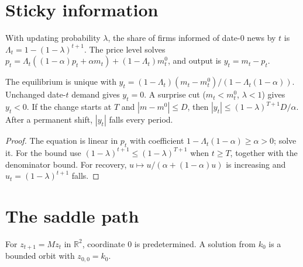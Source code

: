 \section{Sticky information}

\begin{definition}
\label{def:sticky}
\leanok
With updating probability $\lambda$, the share of firms informed of date-0 news by $t$ is
$\Lambda_t = 1-(1-\lambda)^{t+1}$. The price level solves
$p_t = \Lambda_t((1-\alpha)p_t + \alpha m_t) + (1-\Lambda_t)m^0_t$, and output is $y_t = m_t - p_t$.
\end{definition}

\begin{theorem}
\label{thm:sticky}
\leanok
{}
The equilibrium is unique with $y_t = (1-\Lambda_t)(m_t - m^0_t)/(1-\Lambda_t(1-\alpha))$. Unchanged date-$t$ demand
gives $y_t = 0$. A surprise cut ($m_t < m^0_t$, $\lambda<1$) gives $y_t < 0$. If the change starts at $T$ and
$|m - m^0| \le D$, then $|y_t| \le (1-\lambda)^{T+1}D/\alpha$. After a permanent shift, $|y_t|$ falls every period.
\end{theorem}
\begin{proof}
\leanok
The equation is linear in $p_t$ with coefficient $1-\Lambda_t(1-\alpha) \ge \alpha > 0$; solve it. For the bound use
$(1-\lambda)^{t+1} \le (1-\lambda)^{T+1}$ when $t \ge T$, together with the denominator bound. For recovery,
$u \mapsto u/(\alpha + (1-\alpha)u)$ is increasing and $u_t = (1-\lambda)^{t+1}$ falls.
\end{proof}

\section{The saddle path}

\begin{definition}
\label{def:saddle_solution}
\leanok
{}
For $z_{t+1} = Mz_t$ in $\mathbb{R}^2$, coordinate $0$ is predetermined. A solution from $k_0$ is a bounded orbit with
$z_{0,0} = k_0$.
\end{definition}

